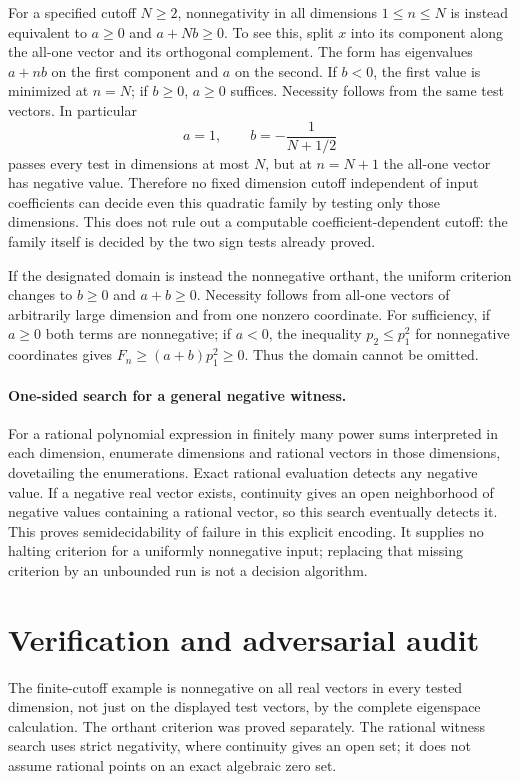 \documentclass[11pt]{article}
\begin{document}
For a specified cutoff $N\geq2$, nonnegativity in all dimensions $1\leq n\leq N$ is instead equivalent to $a\geq0$ and $a+Nb\geq0$. To see this, split $x$ into its component along the all-one vector and its orthogonal complement. The form has eigenvalues $a+nb$ on the first component and $a$ on the second. If $b<0$, the first value is minimized at $n=N$; if $b\geq0$, $a\geq0$ suffices. Necessity follows from the same test vectors. In particular
\[
a=1,\qquad b=-\frac1{N+1/2}
\]
passes every test in dimensions at most $N$, but at $n=N+1$ the all-one vector has negative value. Therefore no fixed dimension cutoff independent of input coefficients can decide even this quadratic family by testing only those dimensions. This does not rule out a computable coefficient-dependent cutoff: the family itself is decided by the two sign tests already proved.

If the designated domain is instead the nonnegative orthant, the uniform criterion changes to $b\geq0$ and $a+b\geq0$. Necessity follows from all-one vectors of arbitrarily large dimension and from one nonzero coordinate. For sufficiency, if $a\geq0$ both terms are nonnegative; if $a<0$, the inequality $p_2\leq p_1^2$ for nonnegative coordinates gives $F_n\geq(a+b)p_1^2\geq0$. Thus the domain cannot be omitted.

\paragraph{One-sided search for a general negative witness.}
For a rational polynomial expression in finitely many power sums interpreted in each dimension, enumerate dimensions and rational vectors in those dimensions, dovetailing the enumerations. Exact rational evaluation detects any negative value. If a negative real vector exists, continuity gives an open neighborhood of negative values containing a rational vector, so this search eventually detects it. This proves semidecidability of failure in this explicit encoding. It supplies no halting criterion for a uniformly nonnegative input; replacing that missing criterion by an unbounded run is not a decision algorithm.
\section{Verification and adversarial audit}
The finite-cutoff example is nonnegative on all real vectors in every tested dimension, not just on the displayed test vectors, by the complete eigenspace calculation. The orthant criterion was proved separately. The rational witness search uses strict negativity, where continuity gives an open set; it does not assume rational points on an exact algebraic zero set.
\end{document}
